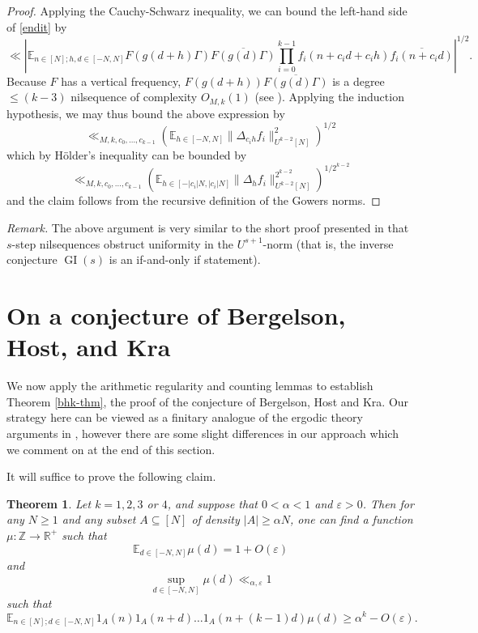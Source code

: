 \documentclass[11pt,reqno]{amsart}
\numberwithin{equation}{section}
\theoremstyle{plain}
\newtheorem{theorem}[subsection]{Theorem}
\theoremstyle{definition}
\renewcommand{\leq}{\leqslant}
\renewcommand{\geq}{\geqslant}
\newcommand\E{{\mathbb{E}}}
\newcommand\Z{\mathbb{Z}}
\newcommand\R{\mathbb{R}}
\newcommand\1{{\bf 1}}
\newcommand\2{{\bf 2}}
\newcommand\eps{\varepsilon}
\newcommand\GI{\operatorname{GI}}
\begin{document}
\begin{proof}
Applying the Cauchy-Schwarz inequality, we can bound the left-hand side of \eqref{endit} by
$$
\ll |\E_{n \in [N]; h,d \in [-N,N]} F(g(d+h)\Gamma) \overline{F(g(d)\Gamma)}
\prod_{i=0}^{k-1} f_i(n + c_i d + c_i h) \overline{f_i(n + c_i d)}|^{1/2}.$$
Because $F$ has a vertical frequency, $F(g(d+h))\overline{F(g(d)\Gamma)}$ is a degree $\leq (k-3)$ nilsequence of complexity $O_{M,k}(1)$ (see \cite[Proposition 7.2]{green-tao-nilratner}).  Applying the induction hypothesis, we may thus bound the above expression by
$$ \ll_{M,k,c_0,\ldots,c_{k-1}} (\E_{h \in [-N,N]} \| \Delta_{c_i h} f_i \|_{U^{k-2}[N]}^2)^{1/2}$$
which by H\"older's inequality can be bounded by
$$ \ll_{M,k,c_0,\ldots,c_{k-1}} (\E_{h \in [-|c_i|N,|c_i|N]} \| \Delta_{h} f_i \|_{U^{k-2}[N]}^{2^{k-2}})^{1/2^{k-2}}$$
and the claim follows from the recursive definition of the Gowers norms.
\end{proof}

\emph{Remark.} The above argument is very similar to the short proof presented in \cite[Appendix G]{green-tao-ziegler-u4inverse} that $s$-step nilsequences obstruct uniformity in the $U^{s+1}$-norm (that is, the inverse conjecture $\GI(s)$ is an if-and-only if statement).


\section{On a conjecture of Bergelson, Host, and Kra}\label{bhk-sec}

We now apply the arithmetic regularity and counting lemmas to establish Theorem \ref{bhk-thm}, the proof of the conjecture of Bergelson, Host and Kra.  
Our strategy here can be viewed as a finitary analogue of the ergodic theory arguments in \cite{bergelson-host-kra}, however there are some slight differences in our approach which we comment on at the end of this section.

It will suffice to prove the following claim.

\begin{theorem}\label{bhk-thm2}  Let $k = 1, 2, 3$ or $4$, and suppose that $0 < \alpha < 1$ and $\eps > 0$.  Then for any $N \geq 1$ and any subset $A \subseteq [N]$ of density $|A| \geq \alpha N$, one can find a function $\mu: \Z \to \R^+$ such that
\begin{equation}\label{mudi}
\E_{d \in [-N,N]} \mu(d) = 1 + O(\eps)
\end{equation}
and
\begin{equation}\label{mudi-2}
 \sup_{d \in [-N,N]} \mu(d) \ll_{\alpha,\eps} 1
\end{equation}
such that
\begin{equation}\label{mudi-3}
 \E_{n \in [N]; d \in [-N,N]} 1_A(n) 1_A(n+d) \ldots 1_A(n+(k-1)d) \mu(d) \geq \alpha^k - O(\eps).
\end{equation}
\end{theorem}
\end{document}
